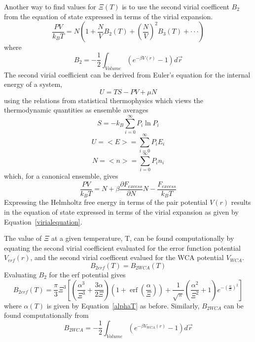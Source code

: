\documentclass[double,12pt]{beavtex}
\begin{document}
Another way to find values for $\Xi(T)$ is to use the second virial coefficent $B_{2}$ from the equation of state expressed in terms of the virial expansion. 
\begin{equation}\label{virialequation}
    \frac{PV}{k_BT}=N\left(1+\frac{N}{V}B_2(T)+\left(\frac{N}{V}\right)^2B_3(T)+ \cdot\cdot\cdot\right) 
\end{equation}
where 
\begin{equation}
	B_{2}=-\frac{1}{2}\int_{Volume}\left(e^{-\beta{V}(r)}-1\right)d\vec{r} 
\end{equation}
The second virial coefficient can be derived from Euler's equation for the internal energy of a system, 
\begin{equation}U=TS-PV+\mu{N}\end{equation}
using the relations from statistical thermophysics which views the thermodynamic quantities as ensemble averages
\begin{equation}S=-k_B\sum_{i=0}^\infty{P_i\ln{P_i}}\end{equation}
\begin{equation}U=<E>=\sum_{i=0}^\infty{P_iE_i}\end{equation}
\begin{equation}N=<n>=\sum_{i=0}^\infty{P_in_i}\end{equation}
which, for a canonical ensemble, gives
\begin{equation}\frac{PV}{k_BT}=N + \beta\frac{\partial{F}_{excess}}{\partial{N}}{N} - \frac{F_{excess}}{k_BT}\end{equation}
Expressing the Helmholtz free energy in terms of the pair potential $V(r)$ results in the equation of state expressed in terms of the virial expansion as given by Equation~\ref{virialequation}.

The value of $\Xi$ at a given temperature, T, can be found computationally by equating the second virial coefficient evaluated for the error function potential $V_{erf}(r)$, and the second virial coefficent evalued for the WCA potential $V_{WCA}$.
\begin{equation}B_{2erf}(T) =B_{2WCA}(T)\end{equation}
Evaluating $B_{2}$ for the erf potential gives
\begin{equation}
	B_{2erf}(T) = \frac{\pi}{3}\Xi^3\left[\left(\frac{\alpha^3}{\Xi^3}+\frac{3\alpha}{2\Xi}\right)\left(1+\operatorname{erf}\left(\frac{\alpha}{\Xi}\right)\right)+\frac{1}{\sqrt{\pi}}\left(\frac{\alpha^2}{\Xi^2}+1\right)e^{-\left(\frac{\alpha}{\Xi}\right)^2}\right]
\end{equation}
where $\alpha(T)$ is given by Equation~\ref{alphaT} as before. Similarly, $B_{2WCA}$ can be found computationally from 
\begin{equation}
	B_{2WCA}=-\frac{1}{2}\int_{Volume}\left(e^{-\beta{V}_{WCA}(r)}-1\right)d\vec{r} 
\end{equation}
 
\end{document}
